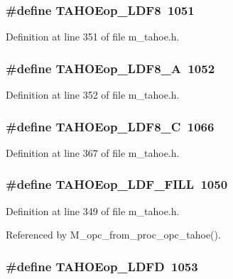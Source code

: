 \subsubsection{\setlength{\rightskip}{0pt plus 5cm}\#define TAHOEop\_\-LDF8~1051}\label{m__tahoe_8h_0f7333dc3b688d6151e67bcfeb7a5348}




Definition at line 351 of file m\_\-tahoe.h.
\subsubsection{\setlength{\rightskip}{0pt plus 5cm}\#define TAHOEop\_\-LDF8\_\-A~1052}\label{m__tahoe_8h_12131e3fc3a413a8246de2140737de0d}




Definition at line 352 of file m\_\-tahoe.h.
\subsubsection{\setlength{\rightskip}{0pt plus 5cm}\#define TAHOEop\_\-LDF8\_\-C~1066}\label{m__tahoe_8h_cb55a6815b54fbf102875fa41cec1688}




Definition at line 367 of file m\_\-tahoe.h.
\subsubsection{\setlength{\rightskip}{0pt plus 5cm}\#define TAHOEop\_\-LDF\_\-FILL~1050}\label{m__tahoe_8h_7071ad8d69bd1a8916b33894759b6587}




Definition at line 349 of file m\_\-tahoe.h.

Referenced by M\_\-opc\_\-from\_\-proc\_\-opc\_\-tahoe().
\subsubsection{\setlength{\rightskip}{0pt plus 5cm}\#define TAHOEop\_\-LDFD~1053}\label{m__tahoe_8h_419efc5ef618dcb6c4941c115ad51f32}




